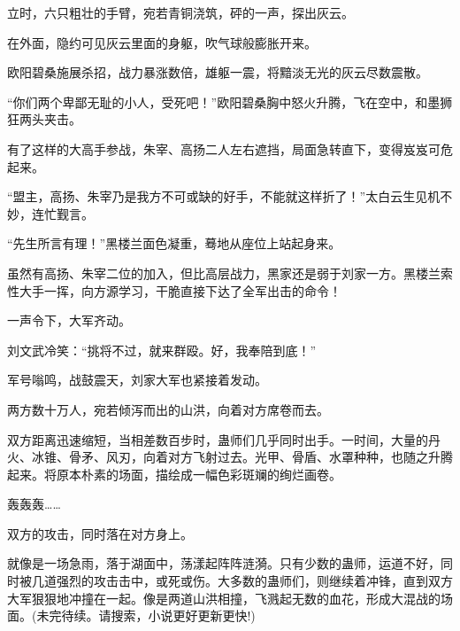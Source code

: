 \begin{this_body}
立时，六只粗壮的手臂，宛若青铜浇筑，砰的一声，探出灰云。

在外面，隐约可见灰云里面的身躯，吹气球般膨胀开来。

欧阳碧桑施展杀招，战力暴涨数倍，雄躯一震，将黯淡无光的灰云尽数震散。

“你们两个卑鄙无耻的小人，受死吧！”欧阳碧桑胸中怒火升腾，飞在空中，和墨狮狂两头夹击。

有了这样的大高手参战，朱宰、高扬二人左右遮挡，局面急转直下，变得岌岌可危起来。

“盟主，高扬、朱宰乃是我方不可或缺的好手，不能就这样折了！”太白云生见机不妙，连忙觐言。

“先生所言有理！”黑楼兰面色凝重，蓦地从座位上站起身来。

虽然有高扬、朱宰二位的加入，但比高层战力，黑家还是弱于刘家一方。黑楼兰索性大手一挥，向方源学习，干脆直接下达了全军出击的命令！

一声令下，大军齐动。

刘文武冷笑：“挑将不过，就来群殴。好，我奉陪到底！”

军号嗡鸣，战鼓震天，刘家大军也紧接着发动。

两方数十万人，宛若倾泻而出的山洪，向着对方席卷而去。

双方距离迅速缩短，当相差数百步时，蛊师们几乎同时出手。一时间，大量的丹火、冰锥、骨矛、风刃，向着对方飞射过去。光甲、骨盾、水罩种种，也随之升腾起来。将原本朴素的场面，描绘成一幅色彩斑斓的绚烂画卷。

轰轰轰……

双方的攻击，同时落在对方身上。

就像是一场急雨，落于湖面中，荡漾起阵阵涟漪。只有少数的蛊师，运道不好，同时被几道强烈的攻击击中，或死或伤。大多数的蛊师们，则继续着冲锋，直到双方大军狠狠地冲撞在一起。像是两道山洪相撞，飞溅起无数的血花，形成大混战的场面。(未完待续。请搜索，小说更好更新更快!)

\end{this_body}

